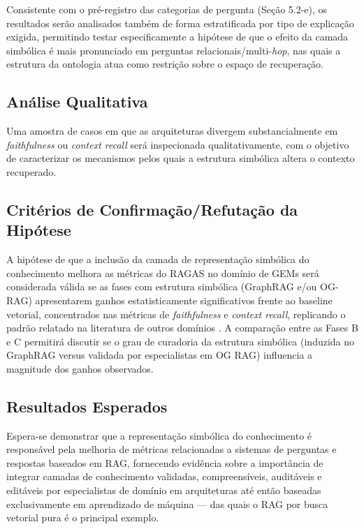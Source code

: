 \documentclass{article}
\begin{document}
Consistente com o pré-registro das categorias de pergunta (Seção 5.2-e), os resultados serão analisados também de forma estratificada por tipo de explicação exigida, permitindo testar especificamente a hipótese de que o efeito da camada simbólica é mais pronunciado em perguntas relacionais/multi-\textit{hop}, nas quais a estrutura da ontologia atua como restrição sobre o espaço de recuperação.

\subsection{Análise Qualitativa}

Uma amostra de casos em que as arquiteturas divergem substancialmente em \textit{faithfulness} ou \textit{context recall} será inspecionada qualitativamente, com o objetivo de caracterizar os mecanismos pelos quais a estrutura simbólica altera o contexto recuperado.

\subsection{Critérios de Confirmação/Refutação da Hipótese}

A hipótese de que a inclusão da camada de representação simbólica do conhecimento melhora as métricas do RAGAS no domínio de GEMs será considerada válida se as fases com estrutura simbólica (GraphRAG e/ou OG-RAG) apresentarem ganhos estatisticamente significativos frente ao baseline vetorial, concentrados nas métricas de \textit{faithfulness} e \textit{context recall}, replicando o padrão relatado na literatura de outros domínios \cite{sharma2025ograg,feng2025ontologyrag,kalra2024hyparag,nie2025aml}. A comparação entre as Fases B e C permitirá discutir se o grau de curadoria da estrutura simbólica (induzida no GraphRAG versus validada por especialistas em OG RAG) influencia a magnitude dos ganhos observados.

\subsection{Resultados Esperados}

Espera-se demonstrar que a representação simbólica do conhecimento é responsável pela melhoria de métricas relacionadas a sistemas de perguntas e respostas baseados em RAG, fornecendo evidência sobre a importância de integrar camadas de conhecimento validadas, compreensíveis, auditáveis e editáveis por especialistas de domínio em arquiteturas até então baseadas exclusivamente em aprendizado de máquina --- das quais o RAG por busca vetorial pura é o principal exemplo.
\end{document}
